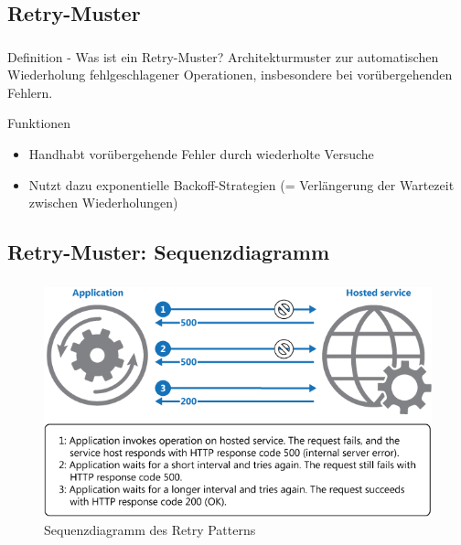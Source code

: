 \subsection{\textbf{Retry-Muster}}
\begin{frame}
    \frametitle{\insertsection}
    \framesubtitle{\insertsubsection}
    \begin{block}{Definition - Was ist ein Retry-Muster?}
        Architekturmuster zur automatischen Wiederholung fehlgeschlagener Operationen, insbesondere bei vorübergehenden Fehlern.
    \end{block}
    \begin{block}{Funktionen}
        \begin{itemize}
            \item Handhabt vorübergehende Fehler durch wiederholte Versuche
            \item Nutzt dazu exponentielle Backoff-Strategien (= Verlängerung der Wartezeit zwischen Wiederholungen)
        \end{itemize}
    \end{block}
\end{frame}

\subsection{Retry-Muster: Sequenzdiagramm}
\begin{frame}
    \frametitle{\insertsection}
    \framesubtitle{\insertsubsection}

    \begin{figure}[h]
        \centering
        \vspace*{-10pt} %
        \includegraphics[height=0.58\textheight]{../images/retry-pattern}
        \caption{Sequenzdiagramm des Retry Patterns~\cite{Microsoft.}}
    \end{figure}
\end{frame}

